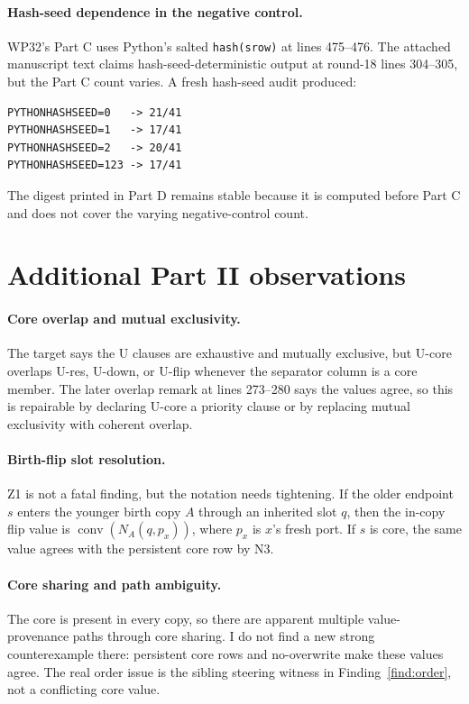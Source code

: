 \documentclass[11pt]{article}
\newcommand{\code}[1]{\texttt{#1}}
\theoremstyle{remark}
\begin{document}
\paragraph{Hash-seed dependence in the negative control.}
WP32's Part C uses Python's salted \code{hash(srow)} at lines 475--476.  The attached manuscript text claims hash-seed-deterministic output at round-18 lines 304--305, but the Part C count varies.  A fresh hash-seed audit produced:
\begin{lstlisting}[style=reviewtext]
PYTHONHASHSEED=0   -> 21/41
PYTHONHASHSEED=1   -> 17/41
PYTHONHASHSEED=2   -> 20/41
PYTHONHASHSEED=123 -> 17/41
\end{lstlisting}
The digest printed in Part D remains stable because it is computed before Part C and does not cover the varying negative-control count.

\section{Additional Part II observations}

\paragraph{Core overlap and mutual exclusivity.}
The target says the U clauses are exhaustive and mutually exclusive, but U-core overlaps U-res, U-down, or U-flip whenever the separator column is a core member.  The later overlap remark at lines 273--280 says the values agree, so this is repairable by declaring U-core a priority clause or by replacing mutual exclusivity with coherent overlap.

\paragraph{Birth-flip slot resolution.}
Z1 is not a fatal finding, but the notation needs tightening.  If the older endpoint $s$ enters the younger birth copy $A$ through an inherited slot $q$, then the in-copy flip value is $\operatorname{conv}(N_A(q,p_x))$, where $p_x$ is $x$'s fresh port.  If $s$ is core, the same value agrees with the persistent core row by N3.

\paragraph{Core sharing and path ambiguity.}
The core is present in every copy, so there are apparent multiple value-provenance paths through core sharing.  I do not find a new strong counterexample there: persistent core rows and no-overwrite make these values agree.  The real order issue is the sibling steering witness in Finding~\ref{find:order}, not a conflicting core value.
\end{document}
